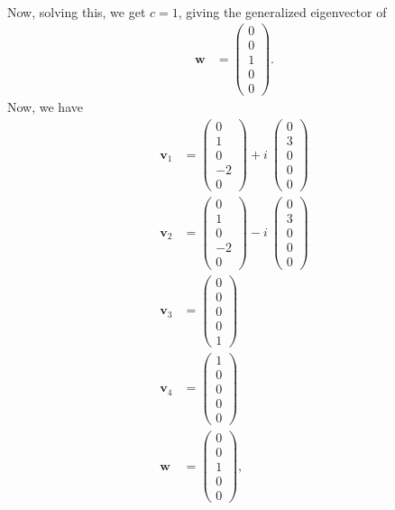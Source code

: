 \documentclass[10pt]{mypackage}
\begin{document}
\begin{example}
\begin{align*}
  \end{align*}
  Now, solving this, we get $c = 1$, giving the generalized eigenvector of
  \begin{align*}
    \mathbf{w} &= \begin{pmatrix}0\\0\\1\\0\\0\end{pmatrix}.
  \end{align*}
  Now, we have
  \begin{align*}
    \mathbf{v}_{1} &= \begin{pmatrix}0\\1\\0\\-2\\0\end{pmatrix} + i \:\begin{pmatrix}0\\3\\0\\0\\0\end{pmatrix}\\
    \mathbf{v}_{2} &= \begin{pmatrix}0\\1\\0\\-2\\0\end{pmatrix} - i \:\begin{pmatrix}0\\3\\0\\0\\0\end{pmatrix}\\
    \mathbf{v}_3 &= \begin{pmatrix}0\\0\\0\\0\\1\end{pmatrix}\\
    \mathbf{v}_4 &= \begin{pmatrix}1\\0\\0\\0\\0\end{pmatrix}\\
    \mathbf{w} &= \begin{pmatrix}0\\0\\1\\0\\0\end{pmatrix},

\end{align*}
\end{example}
\end{document}
